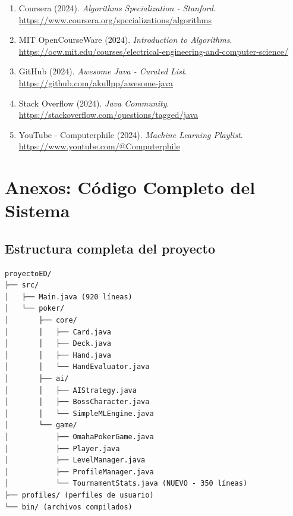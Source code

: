 \documentclass[12pt,a4paper]{article}
\begin{document}
\begin{enumerate}[resume]
    \item Coursera (2024). \textit{Algorithms Specialization - Stanford}. \\
    \url{https://www.coursera.org/specializations/algorithms}
    
    \item MIT OpenCourseWare (2024). \textit{Introduction to Algorithms}. \\
    \url{https://ocw.mit.edu/courses/electrical-engineering-and-computer-science/}
    
    \item GitHub (2024). \textit{Awesome Java - Curated List}. \\
    \url{https://github.com/akullpp/awesome-java}
    
    \item Stack Overflow (2024). \textit{Java Community}. \\
    \url{https://stackoverflow.com/questions/tagged/java}
    
    \item YouTube - Computerphile (2024). \textit{Machine Learning Playlist}. \\
    \url{https://www.youtube.com/@Computerphile}
\end{enumerate}

\newpage

\section{Anexos: Código Completo del Sistema}

\subsection{Estructura completa del proyecto}

\begin{verbatim}
proyectoED/
├── src/
│   ├── Main.java (920 líneas)
│   └── poker/
│       ├── core/
│       │   ├── Card.java
│       │   ├── Deck.java
│       │   ├── Hand.java
│       │   └── HandEvaluator.java
│       ├── ai/
│       │   ├── AIStrategy.java
│       │   ├── BossCharacter.java
│       │   └── SimpleMLEngine.java
│       └── game/
│           ├── OmahaPokerGame.java
│           ├── Player.java
│           ├── LevelManager.java
│           ├── ProfileManager.java
│           └── TournamentStats.java (NUEVO - 350 líneas)
├── profiles/ (perfiles de usuario)
└── bin/ (archivos compilados)
\end{verbatim}
\end{document}
